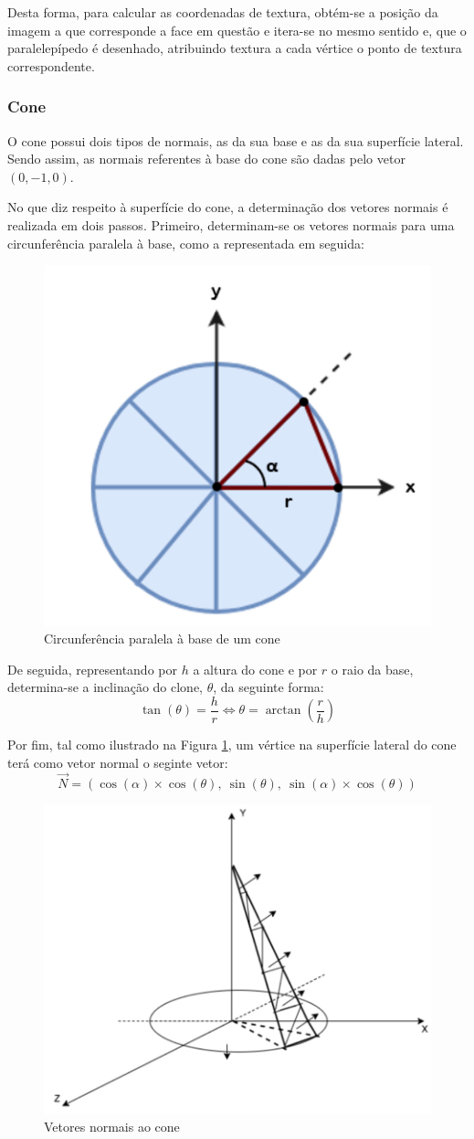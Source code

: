 \documentclass[a4paper, 11pt]{article}
\begin{document}
Desta forma, para calcular as coordenadas de textura, obtém-se a posição da imagem a que 
corresponde a face em questão e itera-se no mesmo sentido e, que o paralelepípedo é desenhado, 
atribuindo textura a cada vértice o ponto de textura correspondente.

\subsubsection{Cone}

O cone possui dois tipos de normais, as da sua base e as da sua superfície lateral. Sendo assim, 
as normais referentes à base do cone são dadas pelo vetor $(0, −1, 0)$.

No que diz respeito à superfície do cone, a determinação dos vetores normais é realizada em  
dois passos. Primeiro, determinam-se os vetores normais para uma circunferência paralela à base, 
como a representada em seguida:

\begin{figure}[H]
    \centering
    \includegraphics[width=.4\textwidth]{img/esfera_normal.png}
    \caption{Circunferência paralela à base de um cone}
\end{figure}

De seguida, representando por $h$ a altura do cone e por $r$ o raio da base, determina-se a 
inclinação do clone, $\theta$, da seguinte forma: $$\tan(\theta) = \frac{h}{r} \Leftrightarrow 
\theta = \arctan \left( \frac{r}{h} \right)$$

Por fim, tal como ilustrado na Figura \ref{fig:cone}, um vértice na superfície lateral do cone 
terá como vetor normal o seginte vetor: $$\overrightarrow{N} = (\cos(\alpha) \times \cos(\theta), 
\ \sin(\theta), \ \sin(\alpha) \times \cos(\theta))$$

 
\begin{figure}[H]
    \centering
    \includegraphics[width=.5\textwidth]{img/cone.png}
    \caption{Vetores normais ao cone}
    \label{fig:cone}
\end{figure}
\end{document}
